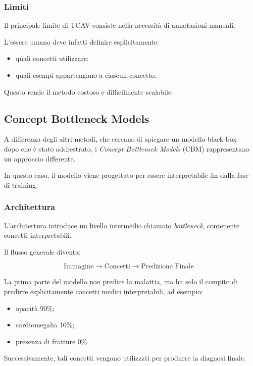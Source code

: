 \subsubsection{Limiti}

Il principale limite di TCAV consiste nella necessità di annotazioni manuali.

L'essere umano deve infatti definire esplicitamente:

\begin{itemize}
    \item quali concetti utilizzare;
    \item quali esempi appartengano a ciascun concetto.
\end{itemize}

Questo rende il metodo costoso e difficilmente scalabile.

\subsection{Concept Bottleneck Models}

A differenza degli altri metodi, che cercano di spiegare un modello black-box dopo che è stato addrestrato, i \textit{Concept Bottleneck Models} (CBM) rappresentano un approccio differente.

In questo caso, il modello viene progettato per essere interpretabile fin dalla fase di training.

\subsubsection{Architettura}

L'architettura introduce un livello intermedio chiamato \textit{bottleneck}, contenente concetti interpretabili.

Il flusso generale diventa:

\[
\text{Immagine} \rightarrow \text{Concetti} \rightarrow \text{Predizione Finale}
\]

La prima parte del modello non predice la malattia, ma ha solo il compito di predirre esplicitamente concetti medici interpretabili, ad esempio:

\begin{itemize}
    \item opacità 90\%;
    \item cardiomegalia 10\%;
    \item presenza di fratture 0\%.
\end{itemize}

Successivamente, tali concetti vengono utilizzati per produrre la diagnosi finale.

